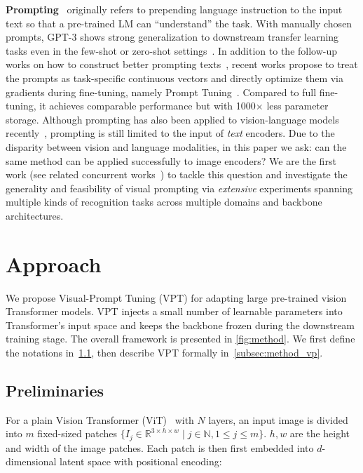 \textbf{Prompting}~\cite{liu2021pre} originally refers to prepending language instruction to the input text so that a pre-trained LM can ``understand'' the task. With manually chosen prompts, GPT-3 shows strong generalization to downstream transfer learning tasks even in the few-shot or zero-shot settings~\cite{brown2020gpt3}. In addition to the follow-up works on how to construct better prompting texts~\cite{shin2020autoprompt,jiang2020can}, recent works propose to treat the prompts as task-specific continuous vectors and directly optimize them via gradients during fine-tuning, namely Prompt Tuning~\cite{li-liang-2021-prefix,lester-etal-2021-power,liu2021p}. Compared to full fine-tuning, it achieves comparable performance but with 1000$\times$ less parameter storage. Although prompting has also been applied to vision-language models recently~\cite{radford2021learning,zhou2021learning,ju2021prompting,yao2021cpt,ge2022domain}, prompting is still limited to the input of \emph{text} encoders. Due to the disparity between vision and language modalities, in this paper we ask: can the same method can be applied successfully to image encoders? We are the first work (see related concurrent works~\cite{sandler2022fine,wang2022learning,conder2022efficient,bahng2022visual}) to tackle this question and investigate the generality and feasibility of visual prompting via  \emph{extensive} experiments spanning multiple kinds of recognition tasks across multiple domains and backbone architectures.

\section{Approach}\label{sec:method}

We propose Visual-Prompt Tuning (\textsc{VPT}) for adapting large pre-trained vision Transformer models. 
\textsc{VPT} injects a small number of learnable parameters into Transformer's input space and keeps the backbone frozen during the downstream training stage. The overall framework is presented in \ref{fig:method}.
We first define the notations in~\ref{subsec:method_pre}, then describe VPT formally in~\ref{subsec:method_vp}.

\subsection{Preliminaries}
\label{subsec:method_pre}

For a plain Vision Transformer (ViT)~\cite{dosovitskiy2020vit} with $N$ layers, an input image is divided into $m$ fixed-sized patches 
$\{I_j\in\mathbb{R}^{3\times h\times w}\mid j\in\mathbb{N}, 1\le j\le m\}$. $h, w$ are the height and width of the image patches. Each patch is then first embedded into $d$-dimensional latent space with positional encoding:

